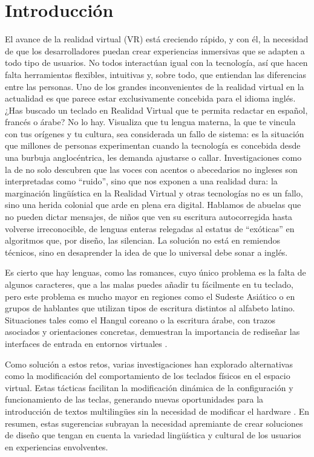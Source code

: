 
\section{Introducción}

El avance de la realidad virtual (VR) está creciendo rápido, y con él, la necesidad de que los desarrolladores puedan crear experiencias inmersivas que se adapten a todo tipo de usuarios. No todos interactúan igual con la tecnología, así que hacen falta herramientas flexibles, intuitivas y, sobre todo, que entiendan las diferencias entre las personas. Uno de los grandes inconvenientes de la realidad virtual en la actualidad es que parece estar exclusivamente concebida para el idioma inglés. ¿Has buscado un teclado en Realidad Virtual que te permita redactar en español, francés o árabe? No lo hay. Visualiza que tu lengua materna, la que te vincula con tus orígenes y tu cultura, sea considerada un fallo de sistema: es la situación que millones de personas experimentan cuando la tecnología es concebida desde una burbuja anglocéntrica, les demanda ajustarse o callar. Investigaciones como la de \cite{rojas2024accented} no solo descubren que las voces con acentos o abecedarios no ingleses son interpretadas como ``ruido'', sino que nos exponen a una realidad dura: la marginación lingüística en la Realidad Virtual y otras tecnologías no es un fallo, sino una herida colonial que arde en plena era digital. Hablamos de abuelas que no pueden dictar mensajes, de niños que ven su escritura autocorregida hasta volverse irreconocible, de lenguas enteras relegadas al estatus de ``exóticas'' en algoritmos que, por diseño, las silencian. La solución no está en remiendos técnicos, sino en desaprender la idea de que lo universal debe sonar a inglés.

Es cierto que hay lenguas, como las romances, cuyo único problema es la falta de algunos caracteres, que a las malas puedes añadir tu fácilmente en tu teclado, pero este problema es mucho mayor en regiones como el Sudeste Asiático o en grupos de hablantes que utilizan tipos de escritura distintos al alfabeto latino. Situaciones tales como el Hangul coreano o la escritura árabe, con trazos asociados y orientaciones concretas, demuestran la importancia de rediseñar las interfaces de entrada en entornos virtuales \cite{peng2024exploring}.

Como solución a estos retos, varias investigaciones han explorado alternativas como la modificación del comportamiento de los teclados físicos en el espacio virtual. Estas tácticas facilitan la modificación dinámica de la configuración y funcionamiento de las teclas, generando nuevas oportunidades para la introducción de textos multilingües sin la necesidad de modificar el hardware \cite{gonzalez2019reconviguration}. En resumen, estas sugerencias subrayan la necesidad apremiante de crear soluciones de diseño que tengan en cuenta la variedad lingüística y cultural de los usuarios en experiencias envolventes.


